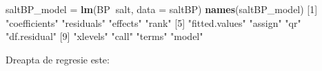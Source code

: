 \documentclass[]{article}
\newenvironment{Shaded}{\begin{snugshade}}{\end{snugshade}}
\newcommand{\KeywordTok}[1]{\textcolor[rgb]{0.13,0.29,0.53}{\textbf{#1}}}
\newcommand{\DataTypeTok}[1]{\textcolor[rgb]{0.13,0.29,0.53}{#1}}
\newcommand{\DecValTok}[1]{\textcolor[rgb]{0.00,0.00,0.81}{#1}}
\newcommand{\FloatTok}[1]{\textcolor[rgb]{0.00,0.00,0.81}{#1}}
\newcommand{\StringTok}[1]{\textcolor[rgb]{0.31,0.60,0.02}{#1}}
\newcommand{\OperatorTok}[1]{\textcolor[rgb]{0.81,0.36,0.00}{\textbf{#1}}}
\newcommand{\NormalTok}[1]{#1}
\begin{document}
\begin{Shaded}
\begin{Highlighting}[]
\NormalTok{saltBP_model =}\StringTok{ }\KeywordTok{lm}\NormalTok{(BP}\OperatorTok{~}\NormalTok{salt, }\DataTypeTok{data =}\NormalTok{ saltBP)}
\KeywordTok{names}\NormalTok{(saltBP_model)}
\NormalTok{ [}\DecValTok{1}\NormalTok{] }\StringTok{"coefficients"}  \StringTok{"residuals"}     \StringTok{"effects"}       \StringTok{"rank"}         
\NormalTok{ [}\DecValTok{5}\NormalTok{] }\StringTok{"fitted.values"} \StringTok{"assign"}        \StringTok{"qr"}            \StringTok{"df.residual"}  
\NormalTok{ [}\DecValTok{9}\NormalTok{] }\StringTok{"xlevels"}       \StringTok{"call"}          \StringTok{"terms"}         \StringTok{"model"}        
\end{Highlighting}
\end{Shaded}

\begin{Shaded}
\end{Shaded}

Dreapta de regresie este:
\end{document}
